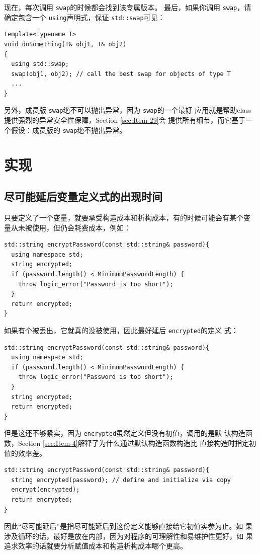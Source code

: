 \documentclass[a4paper,twoside]{article}
\theoremstyle{definition}
\theoremstyle{remark}
\numberwithin{equation}{section}
\let\OldTexttt\texttt
\renewcommand{\texttt}[1]{{\color{blue} \OldTexttt{#1}}}
\begin{document}
现在，每次调用\texttt{swap}的时候都会找到该专属版本。 最后，如果你调用
\texttt{swap}，请确定包含一个\texttt{using}声明式，保证
\texttt{std::swap}可见：

\begin{verbatim}
template<typename T>
void doSomething(T& obj1, T& obj2)
{
  using std::swap;
  swap(obj1, obj2); // call the best swap for objects of type T
  ...
}
\end{verbatim}

另外，成员版\texttt{swap}绝不可以抛出异常，因为\texttt{swap}的一个最好
应用就是帮助class提供强烈的异常安全性保障，Section \ref{sec:Item-29}会
提供所有细节，而它基于一个假设：成员版的\texttt{swap}绝不抛出异常。

\clearpage
\section{实现}

\subsection{尽可能延后变量定义式的出现时间}
\label{sec:Item-26}

只要定义了一个变量，就要承受构造成本和析构成本，有的时候可能会有某个变
量从未被使用，但仍会耗费成本，例如：

\begin{verbatim}
std::string encryptPassword(const std::string& password){
  using namespace std;
  string encrypted;
  if (password.length() < MinimumPasswordLength) {
    throw logic_error("Password is too short");
  }
  return encrypted;
}
\end{verbatim}

如果有个被丢出，它就真的没被使用，因此最好延后\texttt{encrypted}的定义
式：
\begin{verbatim}
std::string encryptPassword(const std::string& password){
  using namespace std;
  if (password.length() < MinimumPasswordLength) {
    throw logic_error("Password is too short");
  }
  string encrypted;
  return encrypted;
}
\end{verbatim}
但是这还不够紧实，因为\texttt{encrypted}虽然定义但没有初值，调用的是默
认构造函数，Section \ref{sec:Item-4}解释了为什么通过默认构造函数构造比
直接构造时指定初值的效率差。
\begin{verbatim}
std::string encryptPassword(const std::string& password){
  string encrypted(password); // define and initialize via copy
  encrypt(encrypted);
  return encrypted;
}
\end{verbatim}
因此“尽可能延后”是指尽可能延后到这份定义能够直接给它初值实参为止。如
果涉及循环的话，最好是放在内部，因为对程序的可理解性和易维护性更好，如
果追求效率的话就要分析赋值成本和构造析构成本哪个更高。
\end{document}

